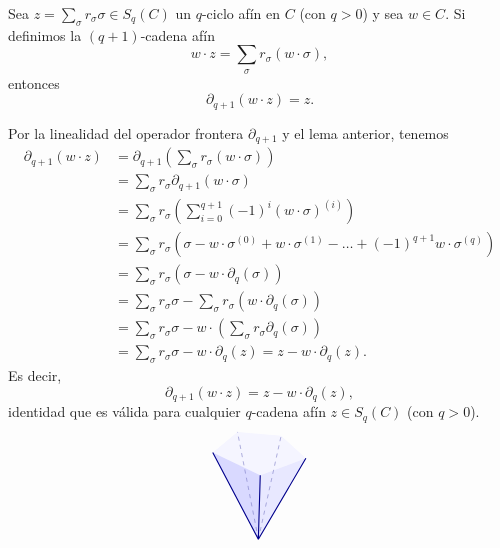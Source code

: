 \begin{lema}
Sea $z = \sum_\sigma r_\sigma \sigma \in S_q(C)$ un $q$-ciclo afín en $C$ (con $q > 0$) y sea $w \in C$. Si definimos la $(q+1)$-cadena afín
\[
w \cdot z = \sum_\sigma r_\sigma (w \cdot \sigma),
\]
entonces
\[
\partial_{q+1}(w \cdot z) = z.
\]
\end{lema}
\begin{dem}
Por la linealidad del operador frontera $\partial_{q+1}$ y el lema anterior, tenemos
\begin{align*}
\partial_{q+1}(w \cdot z) &= \partial_{q+1}\!\left(\sum_\sigma r_\sigma (w \cdot \sigma)\right) \\
&= \sum_\sigma r_\sigma \partial_{q+1}(w \cdot \sigma) \\
&= \sum_\sigma r_\sigma \left(\sum_{i=0}^{q+1} (-1)^i (w \cdot \sigma)^{(i)}\right) \\
&= \sum_\sigma r_\sigma \left(\sigma - w \cdot \sigma^{(0)} + w \cdot \sigma^{(1)} - \dots + (-1)^{q+1} w \cdot \sigma^{(q)}\right) \\
&= \sum_\sigma r_\sigma (\sigma - w \cdot \partial_q(\sigma)) \\
&= \sum_\sigma r_\sigma \sigma - \sum_\sigma r_\sigma (w \cdot \partial_q(\sigma)) \\
&= \sum_\sigma r_\sigma \sigma - w \cdot \left(\sum_\sigma r_\sigma \partial_q(\sigma)\right) \\
&= \sum_\sigma r_\sigma \sigma - w \cdot \partial_q(z) = z - w \cdot \partial_q(z).
\end{align*}
Es decir,
\[
{\partial_{q+1}(w \cdot z) = z - w \cdot \partial_q(z),}
\]
identidad que es válida para cualquier $q$-cadena afín $z \in S_q(C)$ (con $q > 0$).
\[
\begin{tikzpicture}[baseline=(current bounding box.center), scale=0.95]
    \coordinate (W)  at (0, 0);
    \coordinate (P1) at (-1.20, 2.30);
    \coordinate (P2) at (-0.55, 2.85);
    \coordinate (P3) at (0.60, 2.75);
    \coordinate (P4) at (1.25, 2.15);
    \coordinate (P5) at (0.05, 1.70);

    \fill[blue!4]  (P1) -- (P2) -- (P3) -- (P4) -- (P5) -- cycle;
    \fill[blue!15] (W) -- (P1) -- (P5) -- cycle;
    \fill[blue!9]  (W) -- (P5) -- (P4) -- cycle;

    \draw[dashed, blue!55!black!55] (W) -- (P2);
    \draw[dashed, blue!55!black!55] (W) -- (P3);

    \draw[thick, blue!55!black] (W) -- (P1) (W) -- (P5) (W) -- (P4);


\end{tikzpicture}\]
\end{dem}
